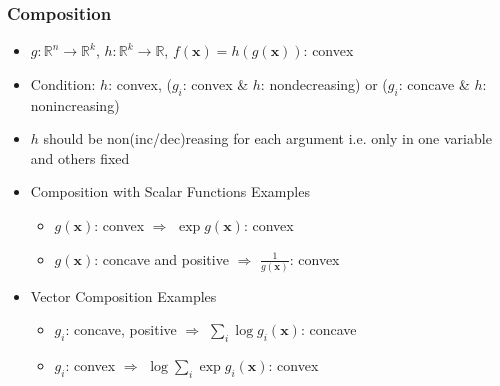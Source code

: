 \subsubsection*{Composition}
\begin{itemize}
    \item $g:\mathbb{R}^n \rightarrow \mathbb{R}^k$, $h:\mathbb{R}^k \rightarrow \mathbb{R}$, $f(\mathbf{x}) = h(g(\mathbf{x}))$: convex
    \item Condition: $h$: convex, ($g_i$: convex \& $h$: nondecreasing) or ($g_i$: concave \& $h$: nonincreasing)
    \item $h$ should be non(inc/dec)reasing for each argument i.e. only in one variable and others fixed
    \item Composition with Scalar Functions Examples
    \begin{itemize}
        \item $g(\mathbf{x})$: convex $\Rightarrow$ $\exp g(\mathbf{x})$: convex
        \item $g(\mathbf{x})$: concave and positive $\Rightarrow$ $\frac 1 {g(\mathbf{x})}$: convex
    \end{itemize}
    \item Vector Composition Examples
    \begin{itemize}
        \item $g_i$: concave, positive $\Rightarrow$ $\sum_{i} \log g_i(\mathbf{x})$: concave
        \item $g_i$: convex $\Rightarrow$ $\log \sum_i \exp g_i(\mathbf{x})$: convex
    \end{itemize}
\end{itemize}

